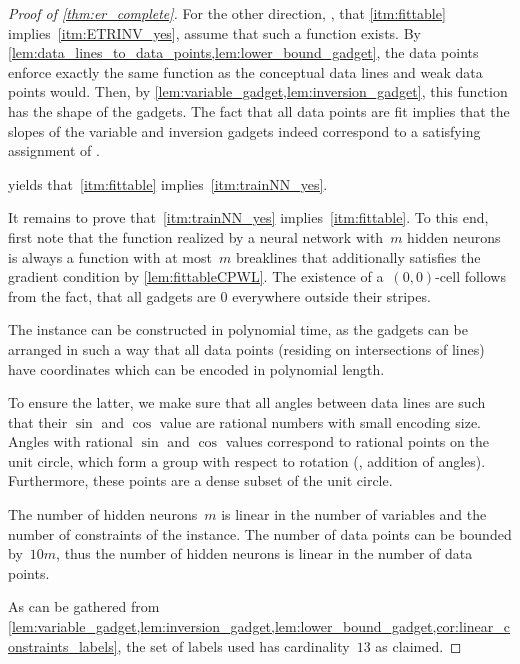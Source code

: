\documentclass{toc}
\begin{document}
\begin{proof}[Proof of \cref{thm:er_complete}]
    For the other direction, \ie, that \ref{itm:fittable} implies~\ref{itm:ETRINV_yes}, assume that such a \CPWL function exists.
    By \cref{lem:data_lines_to_data_points,lem:lower_bound_gadget}, the data points enforce exactly the same \CPWL function as the conceptual data lines and weak data points would.
    Then, by \cref{lem:variable_gadget,lem:inversion_gadget}, this \CPWL function has the shape of the gadgets.
    The fact that all data points are fit implies that the slopes of the variable and inversion gadgets indeed correspond to a satisfying assignment of \ETRINV.

     yields that~\ref{itm:fittable} implies~\ref{itm:trainNN_yes}.

    It remains to prove that~\ref{itm:trainNN_yes} implies~\ref{itm:fittable}.
    To this end, first note that the function realized by a \fullyconnected \twolayer neural network with~$m$ hidden \ReLU neurons is always a \CPWL function with at most~$m$ breaklines that additionally satisfies the gradient condition by \cref{lem:fittableCPWL}.
    The existence of a~$(0,0)$-cell follows from the fact, that all gadgets are
%
$0$ everywhere  %
outside their stripes.

    \medskip
    \noindent
    The \trainNN instance can be constructed in polynomial time, as the gadgets can be arranged in such a way that all data points (residing on intersections of lines) have coordinates which can be encoded in polynomial length.

    To ensure the latter, we make sure that all angles between data lines are such that their $\sin$ and $\cos$ value are rational numbers with small encoding size.
    Angles with rational $\sin$ and $\cos$ values correspond to rational points on the unit circle, which form a group with respect to rotation (\ie, addition of angles). 
    Furthermore, these points are a dense subset of the unit circle.

    The number of hidden neurons~$m$ is linear in the number of variables and the number of constraints of the \ETRINV instance.
    The number of data points can be bounded by~$10m$, thus the number of hidden neurons is linear in the number of data points.

    As can be gathered from \cref{lem:variable_gadget,lem:inversion_gadget,lem:lower_bound_gadget,cor:linear_constraints_labels}, the set of %
labels used  %
has cardinality~$13$ as claimed.
\end{proof}
\end{document}
